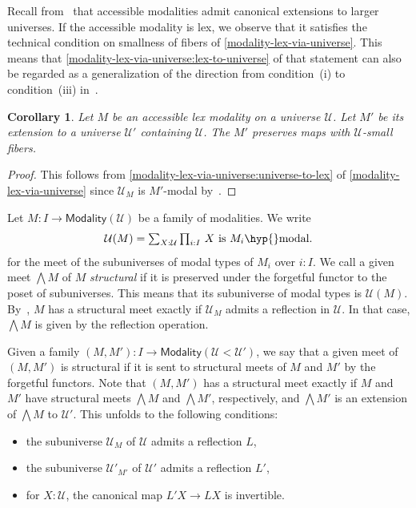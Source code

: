 \documentclass[10pt,a4paper,draft]{article}
\newcommand{\UU}{\mathcal{U}}%
\renewcommand{\~}{\widetilde}
\newcommand{\Modality}{\mathsf{Modality}}
\newtheorem{corollary}[theorem]{Corollary}
\theoremstyle{definition}
\theoremstyle{remark} %
\begin{document}
Recall from~\cite[Subsection~2.3]{RijkeSS17} that accessible modalities admit canonical extensions to larger universes.
If the accessible modality is lex, we observe that it satisfies the technical condition on smallness of fibers of \cref{modality-lex-via-universe}.
This means that \cref{modality-lex-via-universe:lex-to-universe} of that statement can also be regarded as a generalization of the direction from condition~(i) to condition~(iii) in~\cite[Theorem~3.11]{RijkeSS17}.

\begin{corollary}
Let $M$ be an accessible lex modality on a universe $\UU$.
Let $M'$ be its extension to a universe $\UU'$ containing $\UU$.
The $M'$ preserves maps with $\UU$\hyp{}small fibers.
\end{corollary}

\begin{proof}
This follows from \cref{modality-lex-via-universe:universe-to-lex} of \cref{modality-lex-via-universe} since $\UU_M$ is $M'$\hyp{}modal by~\cite[Theorem~3.11]{RijkeSS17}.
\end{proof}

Let $M : I \to \Modality(\UU)$ be a family of modalities.
We write
\begin{equation} \label{subuniverse-structural-meet}
\UU(M) = \textstyle\sum_{X : \UU} \textstyle\prod_{i : I} \,\text{$X$ is $M_i$\hyp{}modal}.
\end{equation}
for the meet of the subuniverses of modal types of $M_i$ over $i : I$.
We call a given meet $\bigwedge M$ of $M$ \emph{structural} if it is preserved under the forgetful functor to the poset of subuniverses.
This means that its subuniverse of modal types is $\UU(M)$.
By~\cite[Theorem 3.11, part (i)]{RijkeSS17}, $M$ has a structural meet exactly if $\UU_M$ admits a reflection in $\UU$.
In that case, $\bigwedge M$ is given by the reflection operation.

Given a family $(M, M') : I \to \Modality(\UU < \UU')$, we say that a given meet of $(M, M')$ is structural if it is sent to structural meets of $M$ and $M'$ by the forgetful functors.
Note that $(M, M')$ has a structural meet exactly if $M$ and $M'$ have structural meets $\bigwedge M$ and $\bigwedge M'$, respectively, and $\bigwedge M'$ is an extension of $\bigwedge M$ to $\UU'$.
This unfolds to the following conditions:
\begin{itemize}
\item
the subuniverse $\UU_M$ of $\UU$ admits a reflection $L$,
\item
the subuniverse $\UU'_{M'}$ of $\UU'$ admits a reflection $L'$,
\item
for $X : \UU$, the canonical map $L'X \to LX$ is invertible.
\end{itemize}
\end{document}
